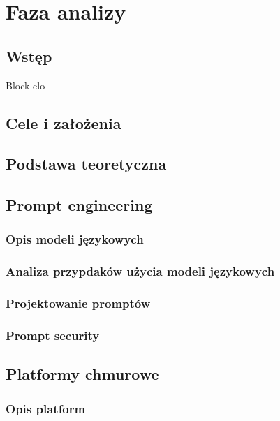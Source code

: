 \section{Faza analizy}
\subsection{Wstęp}

\indent Block elo

\clearpage

\subsection{Cele i założenia}

\subsection{Podstawa teoretyczna}

\subsection{Prompt engineering}

\subsubsection{Opis modeli językowych}

\subsubsection{Analiza przypdaków użycia modeli językowych}

\subsubsection{Projektowanie promptów}

\subsubsection{Prompt security}

\subsection{Platformy chmurowe}

\subsubsection{Opis platform}


